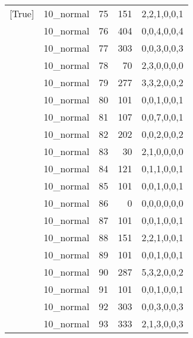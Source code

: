 \begin{tabular}{llrrl}
 [True]          & 10\_normal           &            75 &                   151 & 2,2,1,0,0,1   \\
 [True]          & 10\_normal           &            76 &                   404 & 0,0,4,0,0,4   \\
 [True]          & 10\_normal           &            77 &                   303 & 0,0,3,0,0,3   \\
 [True]          & 10\_normal           &            78 &                    70 & 2,3,0,0,0,0   \\
 [True]          & 10\_normal           &            79 &                   277 & 3,3,2,0,0,2   \\
 [True]          & 10\_normal           &            80 &                   101 & 0,0,1,0,0,1   \\
 [True]          & 10\_normal           &            81 &                   107 & 0,0,7,0,0,1   \\
 [True]          & 10\_normal           &            82 &                   202 & 0,0,2,0,0,2   \\
 [True]          & 10\_normal           &            83 &                    30 & 2,1,0,0,0,0   \\
 [True]          & 10\_normal           &            84 &                   121 & 0,1,1,0,0,1   \\
 [True]          & 10\_normal           &            85 &                   101 & 0,0,1,0,0,1   \\
 [True]          & 10\_normal           &            86 &                     0 & 0,0,0,0,0,0   \\
 [True]          & 10\_normal           &            87 &                   101 & 0,0,1,0,0,1   \\
 [True]          & 10\_normal           &            88 &                   151 & 2,2,1,0,0,1   \\
 [True]          & 10\_normal           &            89 &                   101 & 0,0,1,0,0,1   \\
 [True]          & 10\_normal           &            90 &                   287 & 5,3,2,0,0,2   \\
 [True]          & 10\_normal           &            91 &                   101 & 0,0,1,0,0,1   \\
 [True]          & 10\_normal           &            92 &                   303 & 0,0,3,0,0,3   \\
 [True]          & 10\_normal           &            93 &                   333 & 2,1,3,0,0,3   \\

\end{tabular}
